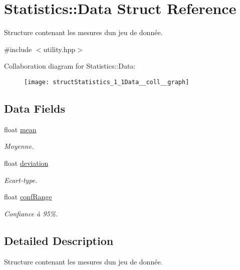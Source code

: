 \hypertarget{structStatistics_1_1Data}{}\section{Statistics\+:\+:Data Struct Reference}
\label{structStatistics_1_1Data}


Structure contenant les mesures d\textquotesingle{}un jeu de donnée.  




{\ttfamily \#include $<$utility.\+hpp$>$}



Collaboration diagram for Statistics\+:\+:Data\+:\nopagebreak
\begin{figure}[H]
\begin{center}
\leavevmode
\texttt{[image: structStatistics\_1\_1Data\_\_coll\_\_graph]}
\end{center}
\end{figure}
\subsection*{Data Fields}
\begin{DoxyCompactItemize}
\item 
float \hyperlink{structStatistics_1_1Data_a70c674f35bce1803c894c1df2649ac3f}{mean}
\begin{DoxyCompactList}\small\item\em Moyenne. \end{DoxyCompactList}\item 
float \hyperlink{structStatistics_1_1Data_a4ab98072b8f7055a828ea80077a059f0}{deviation}
\begin{DoxyCompactList}\small\item\em Ecart-\/type. \end{DoxyCompactList}\item 
float \hyperlink{structStatistics_1_1Data_a098a51c15f9d1c2b0d50fd89fc956c06}{conf\+Range}
\begin{DoxyCompactList}\small\item\em Confiance à 95\%. \end{DoxyCompactList}\end{DoxyCompactItemize}


\subsection{Detailed Description}
Structure contenant les mesures d\textquotesingle{}un jeu de donnée. 

